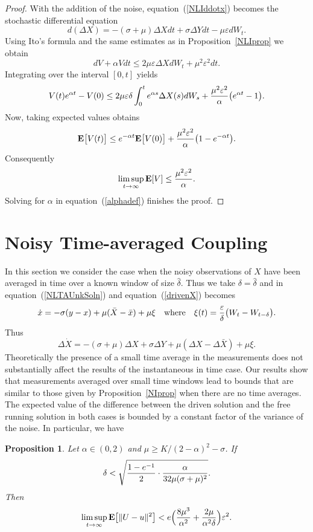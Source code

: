 \documentclass[master,tocprelim,12pt]{unrthesis}
\newtheorem{proposition}{Proposition}[chapter]
\theoremstyle{definition}
\newcommand{\yourdelta}{{\Delta}}
\def\words#1{\quad\hbox{#1}\quad}
\numberwithin{equation}{chapter}
\begin{document}
\begin{manuscript}
\begin{proof}
With the addition of the noise, equation~(\ref{NLIddotx})
becomes the stochastic differential equation
$$
d(\yourdelta X) = -(\sigma + \mu)\yourdelta X dt + \sigma\yourdelta Y dt
 - \mu
{\varepsilon} dW_t.
$$
Using Ito's formula and the same estimates as in 
Proposition~\ref{NLIprop} we obtain
$$d{V} + \alpha V dt \le 
    2\mu\varepsilon \yourdelta X d W_t +\mu^2\varepsilon^2 dt.$$
Integrating over the interval $[0,t]$ yields
$$
	V(t)e^{\alpha t}-V(0)\le 
		2\mu\varepsilon\delta \int_0^t e^{\alpha s}\yourdelta X(s) d W_s
		+{\mu^2\varepsilon^2 \over \alpha}\big( e^{\alpha t} -1 \big).
$$
Now, taking expected values obtains
$$
	{\bf E}\big[V(t)\big]\le e^{-\alpha t}{\bf E}\big[V(0)\big]
		+{\mu^2\varepsilon^2 \over \alpha}\big( 1-e^{-\alpha t} \big).
$$
Consequently
$$
	\limsup_{t\to\infty} {\bf E}[V] \le {\mu^2\varepsilon^2\over\alpha}.
$$
Solving for $\alpha$ in equation~(\ref{alphadef}) finishes the proof.
\end{proof}

\section{Noisy Time-averaged Coupling}\label{NTACsec}

In this section we consider the case when
the noisy observations
of $X$ have been averaged in time over a known window of 
size $\hat\delta$.  Thus we take $\delta=\hat\delta$ and
in equation~(\ref{NLTAUnkSoln}) and
equation~(\ref{drivenX}) becomes
$$
	\dot x = -\sigma(y-x) +\mu(\bar X-\bar x)+\mu\xi
\words{where} \xi(t)={\varepsilon\over\delta}\big(W_t-W_{t-\delta}\big).
$$
Thus
$$
	\yourdelta\dot X 
	=-(\sigma+\mu)\yourdelta X+\sigma\yourdelta Y +
		\mu(\yourdelta X-\yourdelta\bar X)+\mu\xi.
$$
Theoretically the presence of a small time average in the measurements 
does not substantially affect the results of the instantaneous in
time case.
Our results show that measurements averaged over
small time windows lead to bounds that are similar to those given 
by Proposition~\ref{NIprop} when there are no time averages.
The expected value of the difference 
between the driven solution and the free running solution in
both cases is bounded by a constant factor of the variance of the noise.
In particular, we have

\begin{proposition}\label{NTAprop} 
Let $\alpha\in(0,2)$ and $\mu\ge K/(2-\alpha)^2-\sigma$.  If
$$	\delta<
	\sqrt{{1-e^{-1}\over 2}\cdot {\alpha\over 32\mu(\sigma+\mu)^2}}.
$$
Then
$$
	\limsup_{t\to\infty} {\bf E}\big[\|U-u\|^2\big] <
	e\Big({8\mu^3\over\alpha^2}+{2\mu\over \alpha^2\delta}\Big)
		\varepsilon^2.
$$
\end{proposition}


\end{manuscript}
\end{document}
